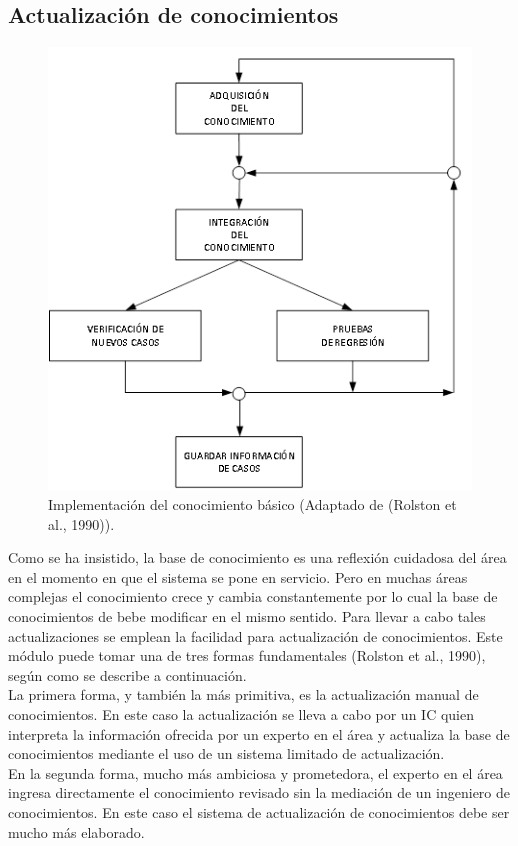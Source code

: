 \subsection{Actualización de conocimientos}
\begin{figure}[H]
\centering
\captionsetup{justification=centering,margin=2cm}
\includegraphics[scale=0.8]{chapters/chapter10/figures/10-4}
\caption{Implementación del conocimiento básico (Adaptado de (Rolston et al., 1990)).}
\label{fig:10-4}
\end{figure}
Como se ha insistido, la base de conocimiento es una reflexión cuidadosa del área en el momento en que el sistema se pone en servicio. Pero en muchas áreas complejas el conocimiento crece y cambia constantemente por lo cual la base de conocimientos de bebe modificar en el mismo sentido. Para llevar a cabo tales actualizaciones se emplean la facilidad para actualización de conocimientos. Este módulo puede tomar una de tres formas fundamentales (Rolston et al., 1990), según como se describe a continuación.\\
La primera forma, y también la más primitiva, es la actualización manual de conocimientos. En este caso la actualización se lleva a cabo por un IC quien interpreta la información ofrecida por un experto en el área y actualiza la base de conocimientos mediante el uso de un sistema limitado de actualización. \\
En la segunda forma, mucho más ambiciosa y prometedora, el experto en el área ingresa directamente el conocimiento revisado sin la mediación de un ingeniero  de conocimientos. En este caso el sistema de actualización de conocimientos debe ser mucho más elaborado.\\
